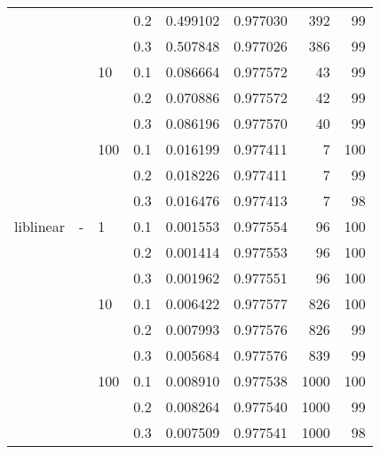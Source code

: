 \begin{table}[H]
\begin{tabular}{llllrrrr}
          &   &     & 0.2 &  0.499102 &  0.977030 &     392 &    99 \\
          &   &     & 0.3 &  0.507848 &  0.977026 &     386 &    99 \\
          &   & 10  & 0.1 &  0.086664 &  0.977572 &      43 &    99 \\
          &   &     & 0.2 &  0.070886 &  0.977572 &      42 &    99 \\
          &   &     & 0.3 &  0.086196 &  0.977570 &      40 &    99 \\
          &   & 100 & 0.1 &  0.016199 &  0.977411 &       7 &   100 \\
          &   &     & 0.2 &  0.018226 &  0.977411 &       7 &    99 \\
          &   &     & 0.3 &  0.016476 &  0.977413 &       7 &    98 \\
liblinear & - & 1   & 0.1 &  0.001553 &  0.977554 &      96 &   100 \\
          &   &     & 0.2 &  0.001414 &  0.977553 &      96 &   100 \\
          &   &     & 0.3 &  0.001962 &  0.977551 &      96 &   100 \\
          &   & 10  & 0.1 &  0.006422 &  0.977577 &     826 &   100 \\
          &   &     & 0.2 &  0.007993 &  0.977576 &     826 &    99 \\
          &   &     & 0.3 &  0.005684 &  0.977576 &     839 &    99 \\
          &   & 100 & 0.1 &  0.008910 &  0.977538 &    1000 &   100 \\
          &   &     & 0.2 &  0.008264 &  0.977540 &    1000 &    99 \\
          &   &     & 0.3 &  0.007509 &  0.977541 &    1000 &    98 \\
\bottomrule
\end{tabular}
\end{table}
